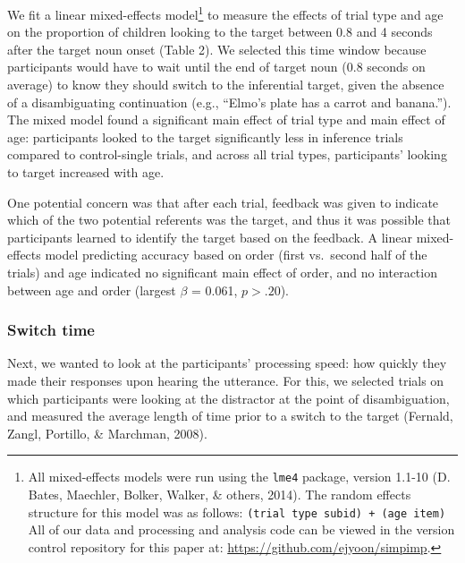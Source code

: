 \documentclass[a4paper,man,apacite,floatsintext]{apa6}
\begin{document}
We fit a linear mixed-effects model\footnote{All mixed-effects models
  were run using the \texttt{lme4} package, version 1.1-10 (D. Bates,
  Maechler, Bolker, Walker, \& others, 2014). The random effects
  structure for this model was as follows:
  \texttt{(trial type \textbar{} subid) + (age \textbar{} item)} All of
  our data and processing and analysis code can be viewed in the version
  control repository for this paper at:
  \url{https://github.com/ejyoon/simpimp}.} to measure the effects of
trial type and age on the proportion of children looking to the target
between 0.8 and 4 seconds after the target noun onset (Table 2). We
selected this time window because participants would have to wait until
the end of target noun (0.8 seconds on average) to know they should
switch to the inferential target, given the absence of a disambiguating
continuation (e.g., ``Elmo's plate has a carrot and banana.''). The
mixed model found a significant main effect of trial type and main
effect of age: participants looked to the target significantly less in
inference trials compared to control-single trials, and across all trial
types, participants' looking to target increased with age.

One potential concern was that after each trial, feedback was given to
indicate which of the two potential referents was the target, and thus
it was possible that participants learned to identify the target based
on the feedback. A linear mixed-effects model predicting accuracy based
on order (first vs.~second half of the trials) and age indicated no
significant main effect of order, and no interaction between age and
order (largest \(\beta\) = 0.061, \(p >.20\)).

\subsubsection{Switch time}\label{switch-time}

Next, we wanted to look at the participants' processing speed: how
quickly they made their responses upon hearing the utterance. For this,
we selected trials on which participants were looking at the distractor
at the point of disambiguation, and measured the average length of time
prior to a switch to the target (Fernald, Zangl, Portillo, \& Marchman,
2008).
\end{document}

